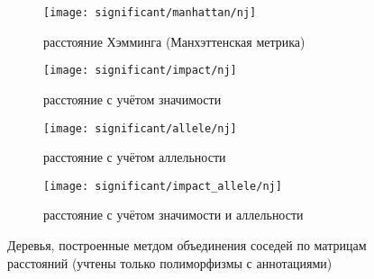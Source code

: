 \documentclass[main.tex]{subfiles}
\begin{document}
\begin{figure}[H]
    \centering
    \begin{subfigure}{.5\textwidth}
        \centering
        \texttt{[image: significant/manhattan/nj]}
        \captionsetup{width=.8\linewidth}
        \caption{расстояние Хэмминга (Манхэттенская метрика)}
        \label{fig:nj_manh}
    \end{subfigure}%
    \begin{subfigure}{.5\textwidth}
        \centering
        \texttt{[image: significant/impact/nj]}
        \captionsetup{width=.8\linewidth}
        \caption{расстояние с учётом значимости}
        \label{fig:nj_impact}
    \end{subfigure}

    \begin{subfigure}{.5\textwidth}
        \centering
        \texttt{[image: significant/allele/nj]}
        \captionsetup{width=.8\linewidth}
        \caption{расстояние с учётом аллельности}
        \label{fig:nj_allele}
    \end{subfigure}%
    \begin{subfigure}{.5\textwidth}
        \centering
        \texttt{[image: significant/impact\_allele/nj]}
        \captionsetup{width=.8\linewidth}
        \caption{расстояние с учётом значимости и аллельности}
        \label{fig:nj_impact_allele}
    \end{subfigure}
    \caption{Деревья, построенные метдом объединения соседей по матрицам расстояний (учтены только полиморфизмы с аннотациями)}
\end{figure}
\end{document}
